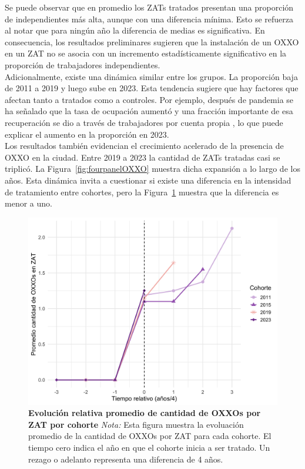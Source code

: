 \documentclass{article}
\begin{document}
Se puede observar que en promedio los ZATs tratados presentan una proporción de independientes más alta, aunque con una diferencia mínima. Esto se refuerza al notar que para ningún año la diferencia de medias es significativa. En consecuencia, los resultados preliminares sugieren que la instalación de un OXXO en un ZAT no se asocia con un incremento estadísticamente significativo en la proporción de trabajadores independientes. \\


Adicionalmente, existe una dinámica similar entre los grupos. La proporción baja de 2011 a 2019 y luego sube en 2023. Esta tendencia sugiere que hay factores que afectan tanto a tratados como a controles. Por ejemplo, después de pandemia se ha señalado que la tasa de ocupación aumentó y una fracción importante de esa recuperación se dio a través de trabajadores por cuenta propia \parencite{alvarez_informalidad_nodate,naranjo_ocupacion_2025,concejo_proyecto_2022,dane_emicron_2025}, lo que puede explicar el aumento en la proporción en 2023. \\

Los resultados también evidencian el crecimiento acelerado de la presencia de OXXO en la ciudad. Entre 2019 a 2023 la cantidad de ZATs tratadas casi se triplicó. La Figura~\ref{fig:fourpanelOXXO} muestra dicha expansión a lo largo de los años. Esta dinámica invita a cuestionar si existe una diferencia en la intensidad de tratamiento entre cohortes, pero la Figura~\ref{fig:intensidad} muestra que la diferencia es menor a uno.

\begin{figure}[H]
    \centering
    \includegraphics[width=0.6\linewidth]{other_figs/oxxos_intensidad_tratamiento.png} %
    \caption{
        \textbf{Evolución relativa promedio de cantidad de OXXOs por ZAT por cohorte} 
        \newline
        \footnotesize{\textit{Nota:} Esta figura muestra la evoluación promedio de la cantidad de OXXOs por ZAT para cada cohorte. El tiempo cero indica el año en que el cohorte inicia a ser tratado. Un rezago o adelanto representa una diferencia de 4 años. }
     }   
    \label{fig:intensidad}
\end{figure}
\end{document}
